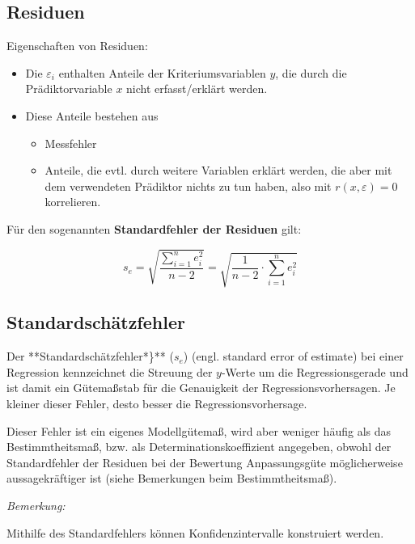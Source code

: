 \documentclass[
]{article}
\providecommand{\tightlist}{%
  \setlength{\itemsep}{0pt}\setlength{\parskip}{0pt}}
\begin{document}
\subsection*{Residuen}\label{residuen}

Eigenschaften von Residuen:

\begin{itemize}
\tightlist
\item
  Die \(\varepsilon_i\) enthalten Anteile der Kriteriumsvariablen \(y\), die durch die Prädiktorvariable \(x\) nicht erfasst/erklärt werden.
\item
  Diese Anteile bestehen aus

  \begin{itemize}
  \tightlist
  \item
    Messfehler
  \item
    Anteile, die evtl. durch weitere Variablen erklärt werden, die aber mit dem verwendeten Prädiktor nichts zu tun haben, also mit \(r(x,\varepsilon) = 0\) korrelieren.
  \end{itemize}
\end{itemize}

Für den sogenannten \textbf{Standardfehler der Residuen} gilt:

\[s_e = \sqrt{\frac{\sum_{i=1}^{n} e_i^2}{n-2}} = \sqrt{\frac{1}{n-2} \cdot \sum_{i=1}^{n} e_i^2}\]

\subsection*{Standardschätzfehler}\label{standardschuxe4tzfehler}

Der **Standardschätzfehler*\}** (\(s_e\)) (engl. standard error of estimate) bei einer Regression kennzeichnet die Streuung der \(y\)-Werte um die Regressionsgerade und ist damit ein Gütemaßstab für die Genauigkeit der Regressionsvorhersagen. Je kleiner dieser Fehler, desto besser die Regressionsvorhersage.

Dieser Fehler ist ein eigenes Modellgütemaß, wird aber weniger häufig als das Bestimmtheitsmaß, bzw. als Determinationskoeffizient angegeben, obwohl der Standardfehler der Residuen bei der Bewertung Anpassungsgüte möglicherweise aussagekräftiger ist (siehe Bemerkungen beim Bestimmtheitsmaß).

\emph{Bemerkung:}

Mithilfe des Standardfehlers können Konfidenzintervalle konstruiert werden.
\end{document}

